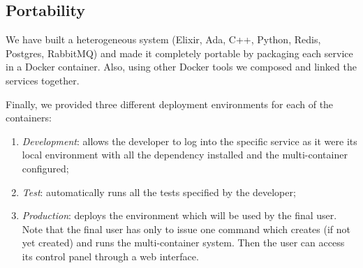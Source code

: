 \subsection{Portability}
We have built a heterogeneous system
(Elixir, Ada, C++, Python, Redis, Postgres, RabbitMQ)
and made it completely portable by packaging each service in a Docker
container.
Also, using other Docker tools we composed and linked the services together.

Finally, we provided three different deployment environments for each of the
containers:
\begin{enumerate}
  \item \textit{Development}: allows the developer to
    log into the specific service as it were its local environment
    with all the dependency installed and the multi-container configured;
  \item \textit{Test}: automatically runs all the tests specified by
    the developer;
  \item \textit{Production}: deploys the environment which will be used by
    the final user. Note that the final user has only to issue one command
    which creates (if not yet created) and runs the multi-container system.
    Then the user can access its control panel through a web interface.
\end{enumerate}
